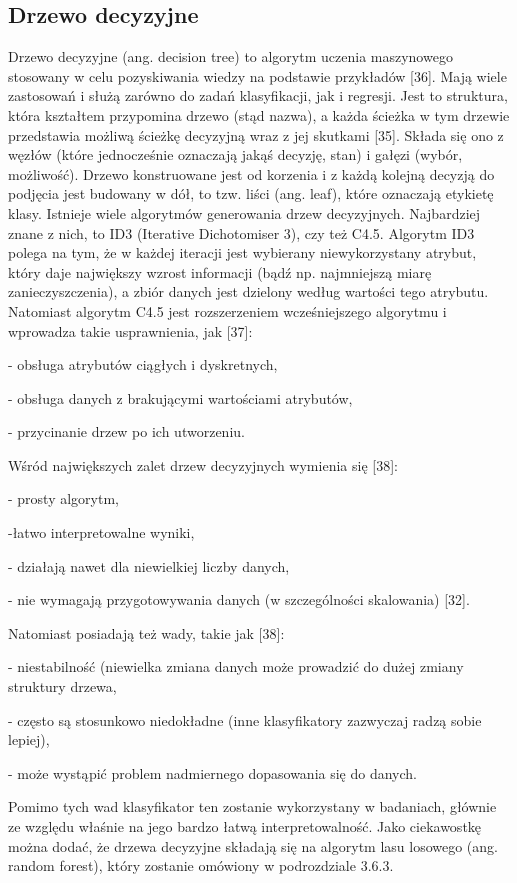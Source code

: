 \subsection{Drzewo decyzyjne}
\label{cha:Drzewo decyzyjne}

Drzewo decyzyjne (ang. decision tree) to algorytm uczenia maszynowego stosowany w celu pozyskiwania wiedzy na podstawie przykładów [36]. Mają wiele zastosowań i służą zarówno do zadań klasyfikacji, jak i regresji. Jest to struktura, która kształtem przypomina drzewo (stąd nazwa), a każda ścieżka w tym drzewie przedstawia możliwą ścieżkę decyzyjną wraz z jej skutkami [35]. Składa się ono z węzłów (które jednocześnie oznaczają jakąś decyzję, stan) i gałęzi (wybór, możliwość). Drzewo konstruowane jest od korzenia i z każdą kolejną decyzją do podjęcia jest budowany w dół, to tzw. liści (ang. leaf), które oznaczają etykietę klasy. Istnieje wiele algorytmów generowania drzew decyzyjnych. Najbardziej znane z nich, to ID3 (Iterative Dichotomiser 3), czy też C4.5. Algorytm ID3 polega na tym, że w każdej iteracji jest wybierany niewykorzystany atrybut, który daje największy wzrost informacji (bądź np. najmniejszą miarę zanieczyszczenia), a zbiór danych jest dzielony według wartości tego atrybutu. Natomiast algorytm C4.5 jest rozszerzeniem wcześniejszego algorytmu i wprowadza takie usprawnienia, jak [37]:

- obsługa atrybutów ciągłych i dyskretnych,

- obsługa danych z brakującymi wartościami atrybutów,

- przycinanie drzew po ich utworzeniu.

\noindent Wśród największych zalet drzew decyzyjnych wymienia się [38]:

- prosty algorytm,

-łatwo interpretowalne wyniki,

- działają nawet dla niewielkiej liczby danych,

- nie wymagają przygotowywania danych (w szczególności skalowania) [32].

\noindent Natomiast posiadają też wady, takie jak [38]:

- niestabilność (niewielka zmiana danych może prowadzić do dużej zmiany struktury drzewa,

- często są stosunkowo niedokładne (inne klasyfikatory zazwyczaj radzą sobie lepiej),

- może wystąpić problem nadmiernego dopasowania się do danych.

\noindent Pomimo tych wad klasyfikator ten zostanie wykorzystany w badaniach, głównie ze względu właśnie na jego bardzo łatwą interpretowalność.
Jako ciekawostkę można dodać, że drzewa decyzyjne składają się na algorytm lasu losowego (ang. random forest), który zostanie omówiony w podrozdziale 3.6.3. 

